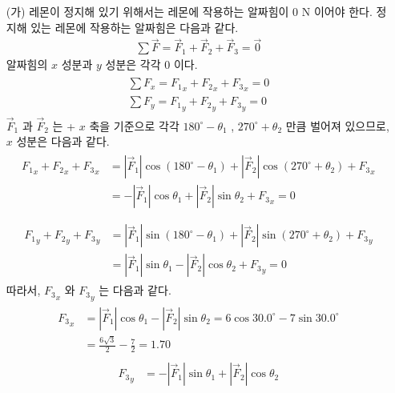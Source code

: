 \documentclass[floatfix,nofootinbib,superscriptaddress,fleqn,preprint]{revtex4}
\begin{document}
\begin{itemize}
  \item[(가)] 레몬이 정지해 있기 위해서는 레몬에 작용하는 알짜힘이
  0 N 이어야 한다. 정지해 있는 레몬에 작용하는 알짜힘은 다음과 같다.
  \begin{align}
    \sum\vec{F}=\vec{F}_1 + \vec{F}_2 + \vec{F}_3 = \vec{0}
  \end{align}
  알짜힘의 $x$ 성분과 $y$ 성분은 각각 0 이다.
  \begin{align}
    \begin{split}
      \sum F_x = {F_1}_x + {F_2}_x + {F_3}_x = 0  \\
      \sum F_y = {F_1}_y + {F_2}_y + {F_3}_y = 0  
    \end{split}
  \end{align}
  $\vec{F}_1$ 과 $\vec{F}_2$ 는 + $x$ 축을 기준으로 각각
  $180^\circ-\theta_1$ , $270^\circ+\theta_2$ 만큼 벌어져 있으므로,
  $x$ 성분은 다음과 같다.
  \begin{align}
    \begin{split}
      {F_1}_x + {F_2}_x + {F_3}_x 
      &= |\vec{F}_1|\cos{(180^\circ-\theta_1)}
      +|\vec{F}_2|\cos{(270^\circ+\theta_2)} + {F_3}_x  \\
      &=-|\vec{F}_1|\cos{\theta_1}
      +|\vec{F}_2|\sin{\theta_2} + {F_3}_x = 0  \\
    \end{split}  
  \end{align}
  \begin{align}
    \begin{split}
      {F_1}_y + {F_2}_y + {F_3}_y 
      &= |\vec{F}_1|\sin{(180^\circ-\theta_1)}
      +|\vec{F}_2|\sin{(270^\circ+\theta_2)} + {F_3}_y  \\
      &= |\vec{F}_1|\sin{\theta_1}
      -|\vec{F}_2|\cos{\theta_2} + {F_3}_y=0
    \end{split}
  \end{align}
  따라서, ${F_3}_x$ 와 ${F_3}_y$ 는 다음과 같다.
  \begin{align}
    \begin{split}
      {F_3}_x&=|\vec{F}_1|\cos{\theta_1}-|\vec{F}_2|\sin{\theta_2} 
      =6\cos{30.0^\circ}-7\sin{30.0^\circ}  \\
      &=\frac{6\sqrt{3}}{2}-\frac{7}{2} = 1.70 
    \end{split}
  \end{align}
  \begin{align}
    \begin{split}
      {F_3}_y&=-|\vec{F}_1|\sin{\theta_1}+|\vec{F}_2|\cos{\theta_2}

\end{split}
\end{align}
\end{itemize}
\end{document}
